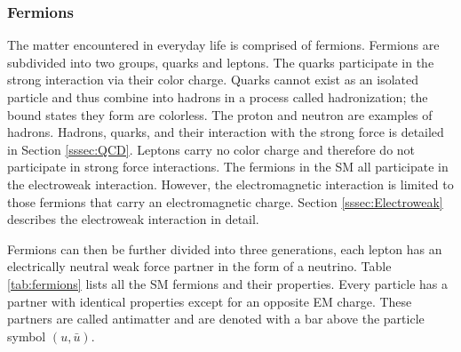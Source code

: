 		\subsubsection{Fermions}\label{sssec:Fermions}
			The matter encountered in everyday life is comprised of fermions. Fermions are subdivided into two groups, quarks and leptons. The quarks participate in the strong interaction via their color charge. Quarks cannot exist as an isolated particle and thus combine into hadrons in a process called hadronization; the bound states they form are colorless. The proton and neutron are examples of hadrons. Hadrons, quarks, and their interaction with the strong force is detailed in Section \ref{sssec:QCD}. Leptons carry no color charge and therefore do not participate in strong force interactions. The fermions in the \gls{SM} all participate in the electroweak interaction. However, the electromagnetic interaction is limited to those fermions that carry an electromagnetic charge. Section \ref{sssec:Electroweak} describes the electroweak interaction in detail.

			Fermions can then be further divided into three generations, each lepton has an electrically neutral weak force partner in the form of a neutrino. Table \ref{tab:fermions} lists all the \gls{SM} fermions and their properties. Every particle has a partner with identical properties except for an opposite \gls{EM} charge. These partners are called antimatter and are denoted with a bar above the particle symbol $(u, \bar{u})$.

